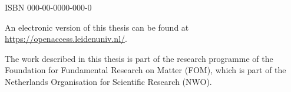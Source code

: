 \begin{titlepage}
\medskip
\noindent ISBN 000-00-0000-000-0

\medskip
\noindent An electronic version of this thesis can be found at \\
\url{https://openaccess.leidenuniv.nl/}.

\medskip

The work described in this thesis is part of the research programme of the
Foundation for Fundamental Research on Matter (FOM), which is part of the
Netherlands Organisation for Scientific Research (NWO). 

\end{titlepage}

